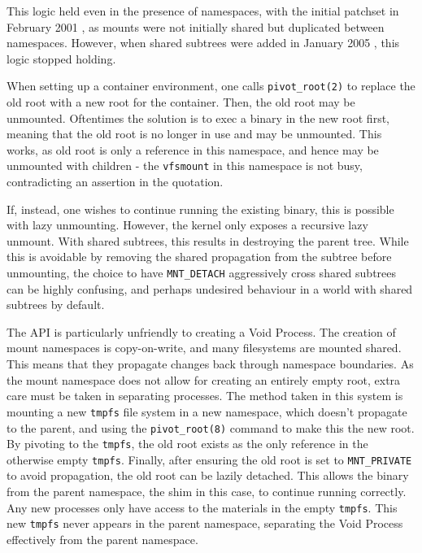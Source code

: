 \documentclass[12pt,a4paper,twoside]{report}
\begin{document}

This logic held even in the presence of namespaces, with the initial patchset in February 2001 \citep{viro_patch_2001}, as mounts were not initially shared but duplicated between namespaces. However, when shared subtrees were added in January 2005 \citep{viro_rfc_2005}, this logic stopped holding.

When setting up a container environment, one calls \texttt{pivot\_root(2)} to replace the old root with a new root for the container. Then, the old root may be unmounted. Oftentimes the solution is to exec a binary in the new root first, meaning that the old root is no longer in use and may be unmounted. This works, as old root is only a reference in this namespace, and hence may be unmounted with children - the \texttt{vfsmount} in this namespace is not busy, contradicting an assertion in the quotation.

If, instead, one wishes to continue running the existing binary, this is possible with lazy unmounting. However, the kernel only exposes a recursive lazy unmount. With shared subtrees, this results in destroying the parent tree. While this is avoidable by removing the shared propagation from the subtree before unmounting, the choice to have \texttt{MNT\_DETACH} aggressively cross shared subtrees can be highly confusing, and perhaps undesired behaviour in a world with shared subtrees by default.

The API is particularly unfriendly to creating a Void Process. The creation of mount namespaces is copy-on-write, and many filesystems are mounted shared. This means that they propagate changes back through namespace boundaries. As the mount namespace does not allow for creating an entirely empty root, extra care must be taken in separating processes. The method taken in this system is mounting a new \texttt{tmpfs} file system in a new namespace, which doesn't propagate to the parent, and using the \texttt{pivot\_root(8)} command to make this the new root. By pivoting to the \texttt{tmpfs}, the old root exists as the only reference in the otherwise empty \texttt{tmpfs}. Finally, after ensuring the old root is set to \texttt{MNT\_PRIVATE} to avoid propagation, the old root can be lazily detached. This allows the binary from the parent namespace, the shim in this case, to continue running correctly. Any new processes only have access to the materials in the empty \texttt{tmpfs}. This new \texttt{tmpfs} never appears in the parent namespace, separating the Void Process effectively from the parent namespace.
\end{document}
